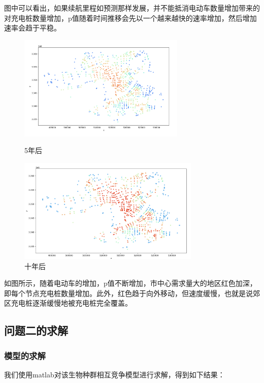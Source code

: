 \documentclass[12pt, a4paper, oneside]{ctexart}
\begin{document}
图中可以看出，如果续航里程如预测那样发展，并不能抵消电动车数量增加带来的对充电桩数量增加，p值随着时间推移会先以一个越来越快的速率增加，然后增加速率会趋于平稳。

\begin{figure}[H]
  \centering
  \begin{minipage}[t]{0.45\textwidth}
    \includegraphics[height=5cm]{pic/随便画的五颜六色图.png}
    \caption{5年后}
  \end{minipage}
  \begin{minipage}[t]{0.45\textwidth}
    \includegraphics[height=5cm]{pic/更红一点的图.png}
    \caption{十年后}
  \end{minipage}

\end{figure}

如图所示，随着电动车的增加，p值不断增加，市中心需求量大的地区红色加深，即每个节点充电桩数量增加。此外，红色趋于向外移动，但速度缓慢，也就是说郊区充电桩逐渐缓慢地被充电桩完全覆盖。

\subsection{问题二的求解}
\subsubsection{模型的求解}

我们使用matlab对该生物种群相互竞争模型进行求解，得到如下结果：
\end{document}
